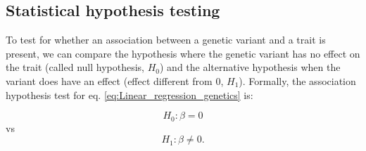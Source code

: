 










\subsection{Statistical hypothesis testing}
\label{sec:hypothesis_testing}

To test for whether an association between a genetic variant and a trait is present, we can compare the hypothesis where the genetic variant has no effect on the trait (called null hypothesis, $H_0$) and the alternative hypothesis when the variant does have an effect (effect different from $0$,  $H_1$).
Formally, the association hypothesis test for eq. \eqref{eq:Linear_regression_genetics} is:

\begin{equation}\label{eq:null_hypothesis}
 H_{0}: \beta=0 
\end{equation}
vs
\begin{equation}\label{eq:alternative_hypothesis}
 H_{1}: \beta \neq 0. 
\end{equation}

